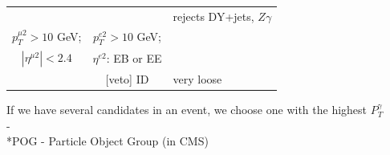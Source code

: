 \begin{frame}
\begin{table}[h]
\begin{center}
\begin{tabular}{|c|c|l|}
      \multicolumn{2}{|c|}{\scriptsize\bfseries\color{blue}{Second lepton veto:}} & rejects DY+jets, $Z\gamma$\\
      \tiny{$p_T^{\mu2}>10$ GeV;} &  \tiny{$p_T^{e2}>10$ GeV;} & \\
      \tiny{$|\eta^{\mu2}|<2.4$}  &   \tiny{ $\eta^{e2}$: EB or EE} &  \\
                                &   \tiny{[veto] ID} & very loose \\ \hline
      \end{tabular}
      \end{center}
  \end{table}
\scriptsize
If we have several candidates in an event, we choose one with the highest $P_T^{\gamma}$\\
-\\
\tiny
*POG - Particle Object Group (in CMS)\\
\end{frame}%


